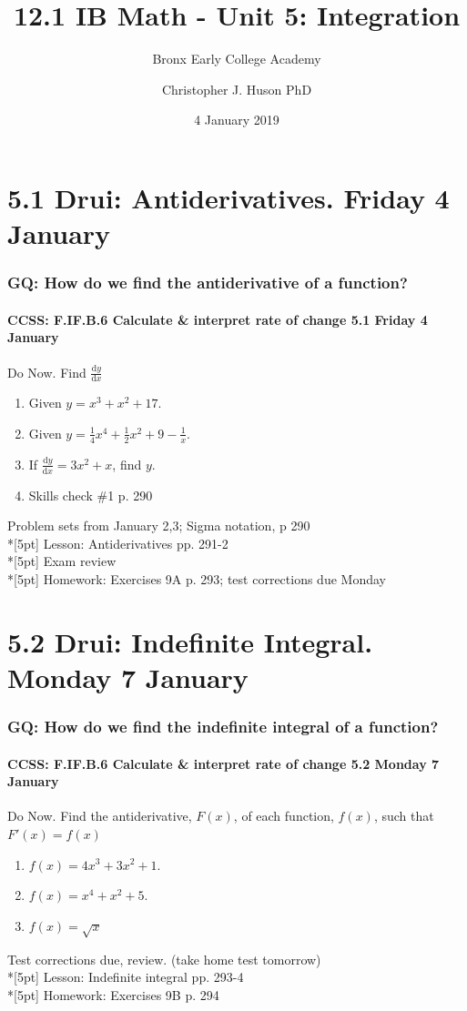 \documentclass{beamer}
\title{12.1 IB Math - Unit 5: Integration}
\subtitle{Bronx Early College Academy}
\author{Christopher J. Huson PhD}
\date{4 January 2019}
\begin{document}
\frame{\titlepage}

\section[Outline]{}
\frame{\tableofcontents}

\section{5.1 Drui: Antiderivatives. Friday 4 January}
  \frame
  {
  \frametitle{GQ: How do we find the antiderivative of a function?}
  \framesubtitle{CCSS: F.IF.B.6 Calculate \& interpret rate of change \hfill \alert{5.1 Friday 4 January}}

  \begin{block}{Do Now. Find $\frac{\mathrm{d}y}{\mathrm{d}x}$}
  \begin{enumerate}
      \item Given $y=x^3+x^2+17$.
      \item Given $y=\frac{1}{4}x^4+\frac{1}{2}x^2+9-\frac{1}{x}$.
      \item If $\displaystyle \frac{\mathrm{d}y}{\mathrm{d}x}=3x^2+x$, find $y$.
      \item Skills check \#1 p. 290
  \end{enumerate}
  \end{block}
  Problem sets from January 2,3; Sigma notation, p 290 \\*[5pt]
  Lesson: Antiderivatives pp. 291-2\\*[5pt]
  Exam review \\*[5pt]
  Homework: Exercises 9A p. 293; test corrections due Monday
}

\section{5.2 Drui: Indefinite Integral. Monday 7 January}
  \frame
  {
  \frametitle{GQ: How do we find the indefinite integral of a function?}
  \framesubtitle{CCSS: F.IF.B.6 Calculate \& interpret rate of change \hfill \alert{5.2 Monday 7 January}}

  \begin{block}{Do Now. Find the antiderivative, $F(x)$, of each function, $f(x)$, such that $F'(x)=f(x)$}
  \begin{enumerate}
      \item $f(x)=4x^3+3x^2+1$.
      \item $f(x)=x^4+x^2+5$.
      \item $f(x)= \sqrt{x}$
  \end{enumerate}
  \end{block}
  Test corrections due, review. (take home test tomorrow)\\*[5pt]
  Lesson: Indefinite integral pp. 293-4\\*[5pt]
  Homework: Exercises 9B p. 294
}
\end{document}
